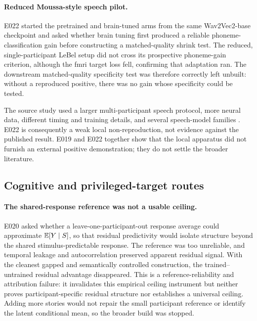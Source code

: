 \paragraph{Reduced Moussa-style speech pilot.}
E022 started the pretrained and brain-tuned arms from the same Wav2Vec2-base checkpoint and asked whether brain tuning first produced a reliable phoneme-classification gain before constructing a matched-quality shrink test.
The reduced, single-participant LeBel setup did not cross its prospective phoneme-gain criterion, although the \ac{fmri} target loss fell, confirming that adaptation ran.
The downstream matched-quality specificity test was therefore correctly left unbuilt: without a reproduced positive, there was no gain whose specificity could be tested. 

The source study used a larger multi-participant speech protocol, more neural data, different timing and training details, and several speech-model families \autocite{moussa2025}.
E022 is consequently a weak local non-reproduction, not evidence against the published result.
E019 and E022 together show that the local apparatus did not furnish an external positive demonstration; they do not settle the broader literature.

\subsection{Cognitive and privileged-target routes}

\paragraph{The shared-response reference was not a usable ceiling.}
E020 asked whether a leave-one-participant-out response average could approximate \(\mathbb{E}[Y \mid S]\), so that residual predictivity would isolate structure beyond the shared stimulus-predictable response.
The reference was too unreliable, and temporal leakage and autocorrelation preserved apparent residual signal.
With the cleanest gapped and semantically controlled construction, the trained--untrained residual advantage disappeared.
This is a reference-reliability and attribution failure: it invalidates this empirical ceiling instrument but neither proves participant-specific residual structure nor establishes a universal ceiling. 
Adding more stories would not repair the small participant reference or identify the latent conditional mean, so the broader build was stopped.

